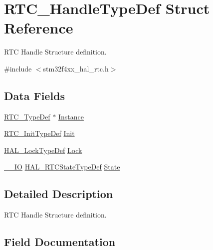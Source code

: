 \hypertarget{struct_r_t_c___handle_type_def}{}\section{R\+T\+C\+\_\+\+Handle\+Type\+Def Struct Reference}
\label{struct_r_t_c___handle_type_def}


R\+TC Handle Structure definition.  




{\ttfamily \#include $<$stm32f4xx\+\_\+hal\+\_\+rtc.\+h$>$}

\subsection*{Data Fields}
\begin{DoxyCompactItemize}
\item 
\hyperlink{struct_r_t_c___type_def}{R\+T\+C\+\_\+\+Type\+Def} $\ast$ \hyperlink{struct_r_t_c___handle_type_def_a6a7bc50c975a169d24ba0a174f260abc}{Instance}
\item 
\hyperlink{struct_r_t_c___init_type_def}{R\+T\+C\+\_\+\+Init\+Type\+Def} \hyperlink{struct_r_t_c___handle_type_def_ad8d1ab770e21b2ff3da405115c5933a7}{Init}
\item 
\hyperlink{stm32f4xx__hal__def_8h_ab367482e943333a1299294eadaad284b}{H\+A\+L\+\_\+\+Lock\+Type\+Def} \hyperlink{struct_r_t_c___handle_type_def_ae72730d37db2c70485236bb9ff400592}{Lock}
\item 
\hyperlink{core__sc300_8h_aec43007d9998a0a0e01faede4133d6be}{\+\_\+\+\_\+\+IO} \hyperlink{group___r_t_c___exported___types_ga1e2460a2d13c4efc7a2a1ab2a1ebd32b}{H\+A\+L\+\_\+\+R\+T\+C\+State\+Type\+Def} \hyperlink{struct_r_t_c___handle_type_def_ae6f4d8c6cf47f2bd0823d5b570e44774}{State}
\end{DoxyCompactItemize}


\subsection{Detailed Description}
R\+TC Handle Structure definition. 

\subsection{Field Documentation}
\mbox{\label{struct_r_t_c___handle_type_def_ad8d1ab770e21b2ff3da405115c5933a7}} 
